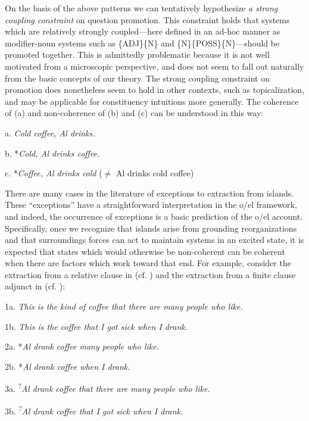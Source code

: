   On the basis of the above patterns we can tentatively hypothesize \textit{a strong coupling constraint} on question promotion. This constraint holds that systems which are relatively strongly coupled—here defined in an ad-hoc manner as modifier-noun systems such as \{ADJ\}\{N\} and \{N\}\{POSS\}\{N\}—should be promoted together. This is admittedly problematic because it is not well motivated from a microscopic perspective, and does not seem to fall out naturally from the basic concepts of our theory. The strong coupling constraint on promotion does nonetheless seem to hold in other contexts, such as topicalization, and may be applicable for constituency intuitions more generally. The coherence of (a) and non-coherence of (b) and (c) can be understood in this way:

  a.  \textit{Cold coffee, Al drinks.}

  b.  *\textit{Cold, Al drinks coffee.}

  c.  *\textit{Coffee, Al drinks cold}  (${\neq}$ Al drinks cold coffee)

  There are many cases in the literature of exceptions to extraction from islands. These “exceptions” have a straightforward interpretation in the o/el framework, and indeed, the occurrence of exceptions is a basic prediction of the o/el account. Specifically, once we recognize that islands arise from grounding reorganizations and that surroundings forces can act to maintain systems in an excited state, it is expected that states which would otherwise be non-coherent can be coherent when there are factors which work toward that end. For example, consider the extraction from a relative clause in  (cf. \citep{Erteschik-ShirLappin1979}) and the extraction from a finite clause adjunct in  (cf. \citep{Truswell2011}):

  1a. \textit{This is the kind of coffee that there are many people who like.}

  1b. \textit{This is the coffee that I got sick when I drank.}

  2a. *\textit{Al drank coffee many people who like.}

  2b. *\textit{Al drank coffee when I drank.}

  3a. \textsuperscript{?}\textit{Al drank coffee that there are many people who like.}

  3b. \textsuperscript{?}\textit{Al drank coffee that I got sick when I drank.}


